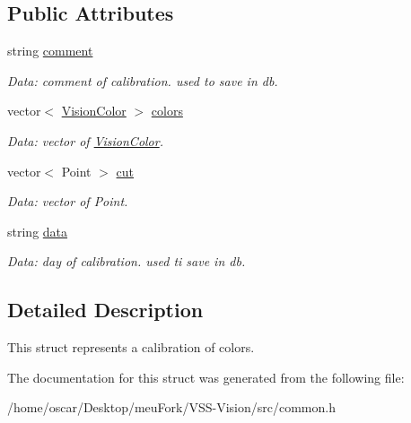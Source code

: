 \subsection*{Public Attributes}
\begin{DoxyCompactItemize}
\item 
\hypertarget{structcommon_1_1Calibration_af7faad7cda5adfffefa44006cdecea85}{string \hyperlink{structcommon_1_1Calibration_af7faad7cda5adfffefa44006cdecea85}{comment}}\label{structcommon_1_1Calibration_af7faad7cda5adfffefa44006cdecea85}

\begin{DoxyCompactList}\small\item\em Data\-: comment of calibration. used to save in db. \end{DoxyCompactList}\item 
\hypertarget{structcommon_1_1Calibration_a219ffe804bda864b9757bc5d32ee49c4}{vector$<$ \hyperlink{structcommon_1_1VisionColor}{Vision\-Color} $>$ \hyperlink{structcommon_1_1Calibration_a219ffe804bda864b9757bc5d32ee49c4}{colors}}\label{structcommon_1_1Calibration_a219ffe804bda864b9757bc5d32ee49c4}

\begin{DoxyCompactList}\small\item\em Data\-: vector of \hyperlink{structcommon_1_1VisionColor}{Vision\-Color}. \end{DoxyCompactList}\item 
\hypertarget{structcommon_1_1Calibration_adb64222af92367a220f889876324edbc}{vector$<$ Point $>$ \hyperlink{structcommon_1_1Calibration_adb64222af92367a220f889876324edbc}{cut}}\label{structcommon_1_1Calibration_adb64222af92367a220f889876324edbc}

\begin{DoxyCompactList}\small\item\em Data\-: vector of Point. \end{DoxyCompactList}\item 
\hypertarget{structcommon_1_1Calibration_abd3a75564db014e04bf2ee76512a3f0b}{string \hyperlink{structcommon_1_1Calibration_abd3a75564db014e04bf2ee76512a3f0b}{data}}\label{structcommon_1_1Calibration_abd3a75564db014e04bf2ee76512a3f0b}

\begin{DoxyCompactList}\small\item\em Data\-: day of calibration. used ti save in db. \end{DoxyCompactList}\end{DoxyCompactItemize}


\subsection{Detailed Description}
This struct represents a calibration of colors. 

The documentation for this struct was generated from the following file\-:\begin{DoxyCompactItemize}
\item 
/home/oscar/\-Desktop/meu\-Fork/\-V\-S\-S-\/\-Vision/src/common.\-h\end{DoxyCompactItemize}
